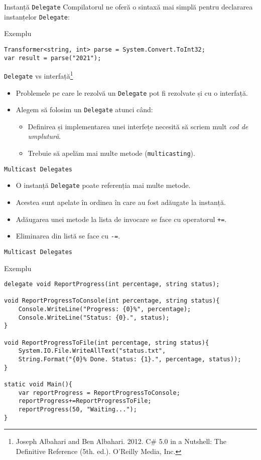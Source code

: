 \documentclass[presentation]{beamer}
\begin{document}
\begin{frame}[label={sec:org76a3aec},fragile]{Instanță \texttt{Delegate}}
 Compilatorul ne oferă o sintaxă mai simplă pentru declararea instanțelor \texttt{Delegate}:
\begin{block}{Exemplu}
\begin{verbatim}
Transformer<string, int> parse = System.Convert.ToInt32;
var result = parse("2021");
\end{verbatim}
\end{block}
\end{frame}
\begin{frame}[label={sec:org4b4410d},fragile]{\texttt{Delegate} vs interfață\footnote{Joseph Albahari and Ben Albahari. 2012. C\# 5.0 in a Nutshell: The Definitive Reference (5th. ed.). O’Reilly Media, Inc.}}
 \begin{itemize}
\item Problemele pe care le rezolvă un \texttt{Delegate} pot fi rezolvate și cu o interfață.
\item Alegem să folosim un \texttt{Delegate} atunci când:
\begin{itemize}
\item Definirea și implementarea unei interfețe necesită să scriem mult \emph{cod de umplutură}.
\item Trebuie să apelăm mai multe metode (\texttt{multicasting}).
\end{itemize}
\end{itemize}
\end{frame}
\begin{frame}[label={sec:org4dae5ad},fragile]{\texttt{Multicast Delegates}}
 \begin{itemize}
\item O instanță \texttt{Delegate} poate referenția mai multe metode.
\item Acestea sunt apelate în ordinea în care au fost adăugate la instanță.
\item Adăugarea unei metode la lista de invocare se face cu operatorul \texttt{+=}.
\item Eliminarea din listă se face cu \texttt{-=}.
\end{itemize}
\end{frame}
\begin{frame}[label={sec:org6046d28},fragile]{\texttt{Multicast Delegates}}
 \begin{block}{Exemplu}
\begin{verbatim}
delegate void ReportProgress(int percentage, string status);

void ReportProgressToConsole(int percentage, string status){
    Console.WriteLine("Progress: {0}%", percentage);
    Console.WriteLine("Status: {0}.", status);
}

void ReportProgressToFile(int percentage, string status){
    System.IO.File.WriteAllText("status.txt",
	String.Format("{0}% Done. Status: {1}.", percentage, status));
}

static void Main(){
    var reportProgress = ReportProgressToConsole;
    reportProgress+=ReportProgressToFile;
    reportProgress(50, "Waiting...");
}
\end{verbatim}
\end{block}
\end{frame}
\end{document}
